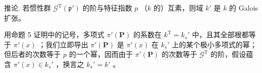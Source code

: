 推论. 若惯性群 \(\mathcal{G}^{\mathrm{T}}(\mathfrak{p}')\) 的阶与特征指数 \(p\) （\(k\) 的）互素，则域 \(k'\) 是 \(k\) 的 Galois 扩张。

用命题 5 证明中的记号，多项式 \(\pi'(\mathbf{P})\) 的系数在 \(k^{\mathrm{T}} = k_{s}'\) 中，且其全部根都等于 \(\pi'(x)\) ；我们立即导出 \(\pi'(\mathbf{P})\) 是 \(\pi'(x)\) 在 \(k_{s}'\) 上的某个极小多项式的幂；但后者的次数等于 \(p\) 的一个幂，因而由于 \(\pi'(\mathbf{P})\) 的次数等于 \(\mathcal{G}^{\mathrm{T}}\) 的阶，假设蕴含 \(\pi'(x) \in k_{s}'\) ，换言之 \(k_{s}' = k'\) 。
